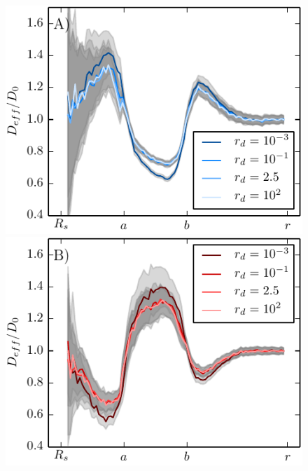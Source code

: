 \vspace{-0.3 cm}\\
\begin{minipage}[t]{.63 \textwidth}
     \begin{figure}[H]
        \hspace{-1cm } \includegraphics[width = 1 \textwidth]{plots/aDeffLong.pdf} \\
        \hspace{-1cm } \includegraphics[width = 1 \textwidth]{plots/rDeffLong.pdf} \\
    \end{figure}
\end{minipage}
